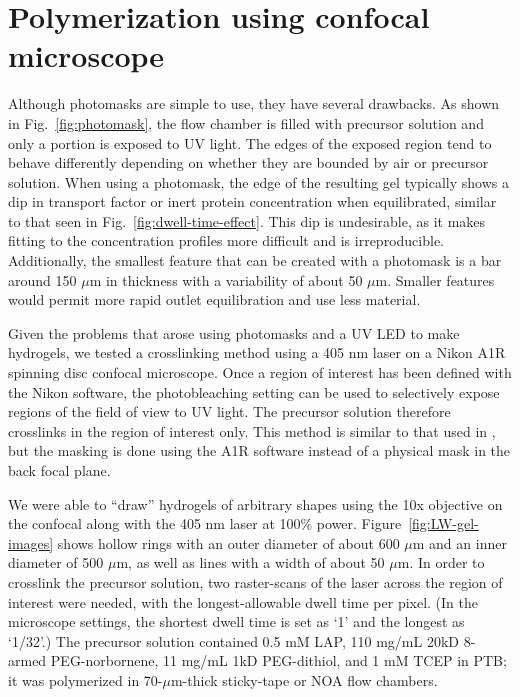 \section{Polymerization using confocal microscope}
\label{sec:confocal-crosslinking}

Although photomasks are simple to use, they have several drawbacks.  As shown in Fig.~\ref{fig:photomask}, the flow chamber is filled with precursor solution and only a portion is exposed to UV light.  The edges of the exposed region tend to behave differently depending on whether they are bounded by air or precursor solution.  When using a photomask, the edge of the resulting gel typically shows a dip in transport factor or inert protein concentration when equilibrated, similar to that seen in Fig.~\ref{fig:dwell-time-effect}.  This dip is undesirable, as it makes fitting to the concentration profiles more difficult and is irreproducible.  Additionally, the smallest feature that can be created with a photomask is a bar around 150 $\mu$m in thickness with a variability of about 50 $\mu$m.  Smaller features would permit more rapid outlet equilibration and use less material.

Given the problems that arose using photomasks and a UV LED to make hydrogels, we tested a crosslinking method using a 405 nm laser on a Nikon A1R spinning disc confocal microscope.  Once a region of interest has been defined with the Nikon software, the photobleaching setting can be used to selectively expose regions of the field of view to UV light.  The precursor solution therefore crosslinks in the region of interest only.  This method is similar to that used in \cite{paustian13}, but the masking is done using the A1R software instead of a physical mask in the back focal plane.

We were able to ``draw'' hydrogels of arbitrary shapes using the 10x objective on the confocal along with the 405 nm laser at 100\% power.  Figure~\ref{fig:LW-gel-images} shows hollow rings with an outer diameter of about 600 $\mu$m and an inner diameter of 500 $\mu$m, as well as lines with a width of about 50 $\mu$m.  In order to crosslink the precursor solution, two raster-scans of the laser across the region of interest were needed, with the longest-allowable dwell time per pixel.  (In the microscope settings, the shortest dwell time is set as `1' and the longest as `1/32'.)  The precursor solution contained 0.5 mM LAP, 110 mg/mL 20kD 8-armed PEG-norbornene, 11 mg/mL 1kD PEG-dithiol, and 1 mM TCEP in PTB; it was polymerized in 70-$\mu$m-thick sticky-tape or NOA flow chambers.

